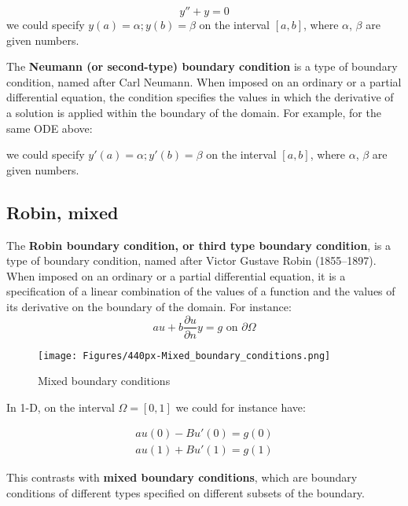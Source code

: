 \begin{equation}
	y''+y=0
\end{equation}
we could specify $y(a)=\alpha; y(b)=\beta$ on the interval $[a,b]$, where $\alpha$, $\beta$ are given numbers.

\medskip

The \textbf{Neumann (or second-type) boundary condition} is a type of boundary condition, named after Carl Neumann. When imposed on an ordinary or a partial differential equation, the condition specifies the values in which the derivative of a solution is applied within the boundary of the domain. For example, for the same ODE above:

we could specify $y'(a)=\alpha; y'(b)=\beta$ on the interval $[a,b]$, where $\alpha$, $\beta$ are given numbers.


\subsection{Robin, mixed}


The \textbf{Robin boundary condition, or third type boundary condition}, is a type of boundary condition, named after Victor Gustave Robin (1855–1897). When imposed on an ordinary or a partial differential equation, it is a specification of a linear combination of the values of a function and the values of its derivative on the boundary of the domain. For instance:\\

\begin{equation}
	au+b\frac{\partial u}{\partial n}y=g \textrm{ on } \partial \Omega
\end{equation}


\begin{figure}
	\begin{center}
		\texttt{[image: Figures/440px-Mixed\_boundary\_conditions.png]}
	\end{center}
	\caption{Mixed boundary conditions}
\end{figure}


In 1-D, on the interval $\Omega=[0,1]$ we could for instance have:

\begin{eqnarray}
	au(0)-Bu'(0)=g(0) \\
	au(1)+Bu'(1)=g(1)
\end{eqnarray}

This contrasts with \textbf{mixed boundary conditions}, which are boundary conditions of different types specified on different subsets of the boundary.

